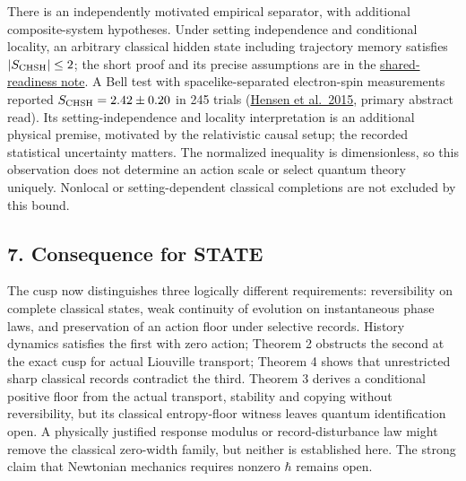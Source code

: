 \documentclass[11pt,a4paper]{article}
\begin{document}
There is an independently motivated empirical separator, with additional
composite-system hypotheses. Under setting independence and conditional
locality, an arbitrary classical hidden state including trajectory
memory satisfies \(|S_{\rm CHSH}|\le2\); the short proof and its precise
assumptions are in the \href{shared-readiness-chsh.md}{shared-readiness
note}. A Bell test with spacelike-separated electron-spin measurements
reported \(S_{\rm CHSH}=2.42\pm0.20\) in 245 trials
(\href{https://doi.org/10.1038/nature15759}{Hensen et al.~2015}, primary
abstract read). Its setting-independence and locality interpretation is
an additional physical premise, motivated by the relativistic causal
setup; the recorded statistical uncertainty matters. The normalized
inequality is dimensionless, so this observation does not determine an
action scale or select quantum theory uniquely. Nonlocal or
setting-dependent classical completions are not excluded by this bound.

\hypertarget{consequence-for-state}{%
\subsection{7. Consequence for STATE}\label{consequence-for-state}}

The cusp now distinguishes three logically different requirements:
reversibility on complete classical states, weak continuity of evolution
on instantaneous phase laws, and preservation of an action floor under
selective records. History dynamics satisfies the first with zero
action; Theorem 2 obstructs the second at the exact cusp for actual
Liouville transport; Theorem 4 shows that unrestricted sharp classical
records contradict the third. Theorem 3 derives a conditional positive
floor from the actual transport, stability and copying without
reversibility, but its classical entropy-floor witness leaves quantum
identification open. A physically justified response modulus or
record-disturbance law might remove the classical zero-width family, but
neither is established here. The strong claim that Newtonian mechanics
requires nonzero \(\hbar\) remains open.
\end{document}
